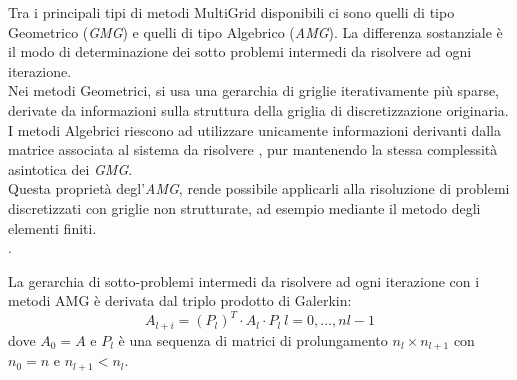 Tra i principali tipi di metodi MultiGrid disponibili ci sono quelli di tipo Geometrico (\emph{GMG}) e quelli di tipo Algebrico (\emph{AMG}).
La differenza sostanziale è il modo di determinazione dei sotto problemi intermedi da risolvere ad ogni iterazione.\\
Nei metodi Geometrici, si usa una gerarchia di griglie iterativamente più sparse, %
derivate da informazioni sulla struttura della griglia di discretizzazione originaria.\\
I metodi Algebrici riescono ad utilizzare unicamente informazioni derivanti dalla matrice associata al sistema da risolvere ,
pur mantenendo la stessa complessità asintotica dei \emph{GMG}.\\
Questa proprietà degl'\emph{AMG}, rende possibile applicarli 
alla risoluzione di problemi discretizzati con griglie non strutturate,
ad esempio mediante il metodo degli elementi finiti.\\
.\\
\par\null\par	%
La gerarchia di sotto-problemi intermedi da risolvere ad ogni iterazione con i metodi AMG è derivata dal triplo prodotto di Galerkin:\\
\begin{equation} \label{eq:galerkin}
A_{l+i} = (P_l)^T \cdot A_l \cdot P_l~l=0,\dots,nl-1
\end{equation}
dove $A_0 = A$  e $P_l$ è una sequenza di matrici di prolungamento $n_l \times n_{l+1}$ con $n_0=n$ e $n_{l+1}<n_l$.\\
\par\null\par
